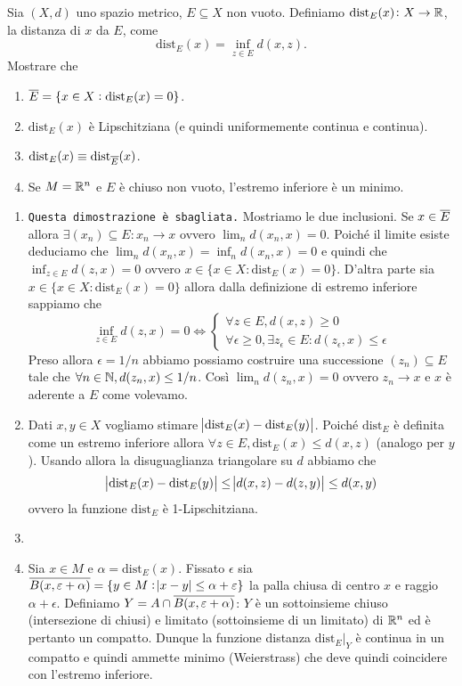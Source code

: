 \begin{vares} \label{es:distanza_da_insieme}
  Sia $ (X, d) $ uno spazio metrico, $ E \subseteq X $ non vuoto. Definiamo $ \mathrm{dist}_E(x) \colon X \to \mathbb{R} $, la distanza di $ x $ da $ E $, come \[\mathrm{dist}_E(x) = \inf_{z \in E}{d(x, z)}.\] Mostrare che
  \begin{enumerate}[label = (\roman*)]
  \item $ \overline{E} = \{x \in X : \mathrm{dist}_E(x) = 0\} $.
  \item $ \mathrm{dist}_E(x) $ è Lipschitziana (e quindi uniformemente continua e continua).
  \item $ \mathrm{dist}_E(x) \equiv \mathrm{dist}_{\overline{E}}(x) $.
  \item Se $ M = \mathbb{R}^n $ e $ E $ è chiuso non vuoto, l'estremo inferiore è un minimo.
  \end{enumerate}
\end{vares}
%
\begin{enumerate}[label = (\roman*)]
\item \texttt{Questa dimostrazione è sbagliata.} Mostriamo le due inclusioni. Se $ x \in \overline{E} $ allora $ \exists (x_n) \subseteq E : x_n \to x $ ovvero $ \lim_{n} d(x_n, x) = 0 $. Poiché il limite esiste deduciamo che $ \lim_{n} d(x_n, x) = \inf_{n} d(x_n, x) = 0 $ e quindi che $ \inf_{z \in E} d(z, x) = 0 $ ovvero $ x \in \{x \in X : \mathrm{dist}_E(x) = 0\} $. D'altra parte sia $ x \in \{x \in X : \mathrm{dist}_E(x) = 0\} $ allora dalla definizione di estremo inferiore sappiamo che
  \[\inf_{z \in E} d(z, x) = 0 \iff
    \begin{cases}
      \forall z \in E, d(x, z) \geq 0 \\
      \forall \epsilon \geq 0, \exists z_\epsilon \in E : d(z_{\epsilon}, x) \leq \epsilon
    \end{cases}\]
  Preso allora $ \epsilon = 1/n $ abbiamo possiamo costruire una successione $ (z_n) \subseteq E $ tale che $ \forall n \in \mathbb{N}, d(z_n, x) \leq 1/n $. Così $ \lim_n d(z_n, x) = 0 $ ovvero $ z_n \to x $ e $ x $ è aderente a $ E $ come volevamo.
\item Dati $ x, y \in X $ vogliamo stimare $ \abs{\mathrm{dist}_E(x) - \mathrm{dist}_E(y)} $. Poiché $ \mathrm{dist}_E $ è definita come un estremo inferiore allora $ \forall z \in E, \mathrm{dist}_E(x) \leq d(x, z) $ (analogo per $ y $). Usando allora la disuguaglianza triangolare su $ d $ abbiamo che \[\abs{\mathrm{dist}_E(x) - \mathrm{dist}_E(y)} \leq \abs{d(x, z) - d(z, y)} \leq d(x, y)\] ovvero la funzione $ \mathrm{dist}_E $ è 1-Lipschitziana.
\item
\item Sia $ x \in M $ e $ \alpha = \mathrm{dist}_E(x) $. Fissato $ \epsilon $ sia $ \overline{B(x, \varepsilon + \alpha)} = \{y \in M : \abs{x - y} \leq \alpha + \varepsilon\} $ la palla chiusa di centro $ x $ e raggio $ \alpha + \epsilon $. Definiamo $ Y = A \cap \overline{B(x, \varepsilon + \alpha)} $: $ Y $ è un sottoinsieme chiuso (intersezione di chiusi) e limitato (sottoinsieme di un limitato) di $ \mathbb{R}^n $ ed è pertanto un compatto. Dunque la funzione distanza $ \mathrm{dist}_E|_{Y} $ è continua in un compatto e quindi ammette minimo (Weierstrass) che deve quindi coincidere con l'estremo inferiore.
\end{enumerate}

